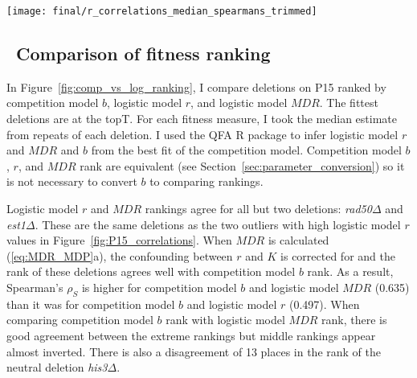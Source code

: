 \graphicspath{{images/p15_correlations/}}
\begin{Figure}
  \centering
  \texttt{[image: final/r\_correlations\_median\_spearmans\_trimmed]}
  \label{fig:P15_correlations}
\end{Figure}

\subsection{\thesubsection~Comparison of fitness ranking}


In Figure~\ref{fig:comp_vs_log_ranking}, I compare deletions on P15
ranked by competition model \(b\), logistic model \(r\), and logistic
model \(MDR\). The fittest deletions are at the topT. For each fitness
measure, I took the median estimate from repeats of each deletion. I
used the QFA R package to infer logistic model \(r\) and \(MDR\) and
\(b\) from the best fit of the competition model. Competition model
\(b\), \(r\), and \(MDR\) rank are equivalent (see
Section~\ref{sec:parameter_conversion}) so it is not necessary to
convert \(b\) to comparing rankings.

Logistic model \(r\) and \(MDR\) rankings agree for all but two
deletions: \textit{rad50\(\Delta\)} and \textit{est1\(\Delta\)}. These
are the same deletions as the two outliers with high logistic model
\(r\) values in Figure~\ref{fig:P15_correlations}. When \(MDR\) is
calculated (\ref{eq:MDR_MDP}a), the confounding between \(r\) and
\(K\) is corrected for and the rank of these deletions agrees well
with competition model \(b\) rank. As a result, Spearman's
\(\rho_{S}\) is higher for competition model \(b\) and logistic model
\(MDR\) (0.635) than it was for competition model \(b\) and logistic
model \(r\) (0.497). When comparing competition model \(b\) rank with
logistic model \(MDR\) rank, there is good agreement between the
extreme rankings but middle rankings appear almost inverted. There is
also a disagreement of 13 places in the rank of the neutral deletion
\textit{his3\(\Delta\)}.



